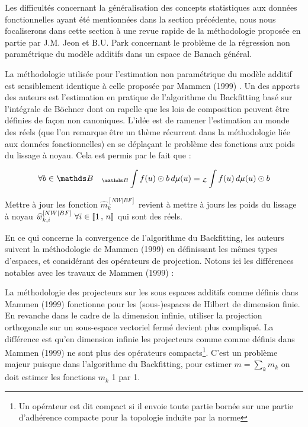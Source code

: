 {
    Les difficultés concernant la généralisation des concepts statistiques aux données fonctionnelles ayant été mentionnées dans la section précédente, nous nous focaliserons dans cette section à une revue rapide de la méthodologie proposée en partie par J.M. Jeon et B.U. Park concernant le problème de la régression non paramétrique du modèle additifs  dans un espace de Banach général.

    \bigskip\bigskip

    La méthodologie utilisée pour l'estimation non paramétrique du modèle additif est sensiblement identique à celle proposée par Mammen (1999) \cite{mammen1999existence}. Un des apports des auteurs est l'estimation en pratique de l'algorithme du Backfitting basé sur l'intégrale de Böchner dont on rapelle que les lois de composition peuvent être définies de façon non canoniques. L'idée est de ramener l'estimation au monde des réels (que l'on remarque être un thème récurrent dans la méthodologie liée aux données fonctionnelles) en se déplaçant le problème des fonctions aux poids du lissage à noyau. Cela est permis par le fait que :

    \begin{equation}
        \forall b \in \mathds B \quad \boch f(u) \odot b \, d\mu(u) = \leb f(u) \, d\mu(u) \odot b
    \end{equation}

    Mettre à jour les fonction $\widehat m_k^{[NW | BF]}$ revient à mettre à jours les poids du lissage à noyau $\widehat w_{k,i}^{[NW | BF]} \ \forall i \in \llbracket 1 \, , \, n \rrbracket$ qui sont des réels.

    \bigskip

    En ce qui concerne la convergence de l'algorithme du Backfitting, les auteurs suivent la méthodologie de Mammen (1999) \cite{mammen1999existence} en définissant les mêmes types d'espaces, et considérant des opérateurs de projection. Notons ici les différences notables avec les travaux de Mammen (1999) \cite{mammen1999existence} :

    La méthodologie des projecteurs sur les sous espaces additifs comme définis dans Mammen (1999) fonctionne pour les (sous-)espaces de Hilbert de dimension finie. En revanche dans le cadre de la dimension infinie, utiliser la projection orthogonale sur un sous-espace vectoriel fermé devient plus compliqué. La différence est qu'en dimension infinie les projecteurs comme comme définis dans Mammen (1999) ne sont plus des opérateurs compacts\footnote{Un opérateur est dit compact si il envoie toute partie bornée sur une partie d'adhérence compacte pour la topologie induite par la norme}. C'est un problème majeur puisque dans l'algorithme du Backfitting, pour estimer $m = \sum_k m_k$ on doit estimer les fonctions $m_k$ 1 par 1. 
    
}
